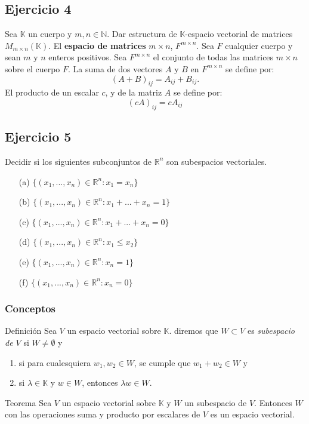 \documentclass[a4paper,12pt]{article}
\begin{document}
\subsection{Ejercicio 4}
Sea $\mathbb{K}$ un cuerpo y $m,n \in \mathbb{N}$. Dar estructura de $\mathbb{K}$-espacio vectorial de matrices $M_{m\times n}(\mathbb{K})$.
\newline El \textbf{espacio de matrices} $m \times n$, $F^{m \times n}$. Sea $F$ cualquier cuerpo y sean $m$ y $n$ enteros positivos. Sea $F^{m \times n}$ el conjunto de todas las matrices $m \times n$ sobre el cuerpo $F$. La suma de dos vectores $A$ y $B$ en $F^{m \times n}$ se define por:
$$
(A + B)_{ij}= A_{ij} + B_{ij}.
$$
El producto de un escalar $c$, y de la matriz $A$ se define por:
$$
(cA)_{ij}= cA_{ij}
$$
\subsection{Ejercicio 5}
Decidir si los siguientes subconjuntos de $\mathds{R}^n$ son subespacios vectoriales.
\begin{itemize}
    \item[(a)] $\{ (x_1,...,x_n) \in  \mathds{R}^n : x_1=x_n\}$
    \item[(b)] $\{ (x_1,...,x_n) \in  \mathds{R}^n : x_1+...+x_n=1 \}$
    \item[(c)] $\{ (x_1,...,x_n) \in  \mathds{R}^n : x_1+...+x_n=0 \}$
    \item[(d)] $\{ (x_1,...,x_n) \in  \mathds{R}^n : x_1 \leq x_2 \}$
    \item[(e)] $\{ (x_1,...,x_n) \in  \mathds{R}^n : x_n=1 \}$
    \item[(f)] $\{ (x_1,...,x_n) \in  \mathds{R}^n : x_n=0 \}$
\end{itemize}
\subsubsection{Conceptos}
\begin{defbox}{Definición}
    Sea $V$ un espacio vectorial sobre $\mathds{K}$. diremos que $W \subset V$ es \textit{subespacio de $V$} si $W \neq \emptyset$ y
        \begin{enumerate}
            \item\label{def-sub-a} si para cualesquiera $w_1,w_2 \in W$, se cumple que $w_1+w_2 \in W$ y
            \item\label{def-sub-b} si $\lambda \in \mathds{K}$ y  $w \in W$, entonces $\lambda w \in W$.
        \end{enumerate}
\end{defbox}
\begin{teobox}{Teorema}
    Sea $V$ un espacio vectorial sobre $\mathds{K}$ y $W$ un subespacio de $V$. Entonces $W$ con las operaciones suma y producto por escalares de $V$ es un espacio vectorial.
\end{teobox}
\end{document}
